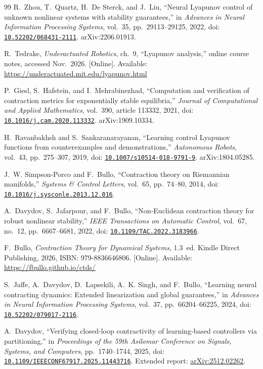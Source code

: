 \documentclass[12pt,onecolumn,journal]{IEEEtran}
\begin{document}
\begin{thebibliography}{99}
R.~Zhou, T.~Quartz, H.~De Sterck, and J.~Liu,
``Neural Lyapunov control of unknown nonlinear systems with stability guarantees,''
in \emph{Advances in Neural Information Processing Systems}, vol.~35, pp.~29113--29125, 2022, doi: \href{https://doi.org/10.52202/068431-2111}{\nolinkurl{10.52202/068431-2111}}. arXiv:2206.01913.

R.~Tedrake,
\emph{Underactuated Robotics}, ch.~9, ``Lyapunov analysis,'' online course notes, accessed Nov.~2026. [Online]. Available: \url{https://underactuated.mit.edu/lyapunov.html}

P.~Giesl, S.~Hafstein, and I.~Mehrabinezhad,
``Computation and verification of contraction metrics for exponentially stable equilibria,''
\emph{Journal of Computational and Applied Mathematics}, vol.~390, article 113332, 2021, doi: \href{https://doi.org/10.1016/j.cam.2020.113332}{\nolinkurl{10.1016/j.cam.2020.113332}}. arXiv:1909.10334.

H.~Ravanbakhsh and S.~Sankaranarayanan,
``Learning control Lyapunov functions from counterexamples and demonstrations,''
\emph{Autonomous Robots}, vol.~43, pp.~275--307, 2019, doi: \href{https://doi.org/10.1007/s10514-018-9791-9}{\nolinkurl{10.1007/s10514-018-9791-9}}. arXiv:1804.05285.

J.~W. Simpson-Porco and F.~Bullo,
``Contraction theory on Riemannian manifolds,''
\emph{Systems \& Control Letters}, vol.~65, pp.~74--80, 2014,
doi: \href{https://doi.org/10.1016/j.sysconle.2013.12.016}{\nolinkurl{10.1016/j.sysconle.2013.12.016}}.

A.~Davydov, S.~Jafarpour, and F.~Bullo,
``Non-Euclidean contraction theory for robust nonlinear stability,''
\emph{IEEE Transactions on Automatic Control}, vol.~67, no.~12, pp.~6667--6681, 2022,
doi: \href{https://doi.org/10.1109/TAC.2022.3183966}{\nolinkurl{10.1109/TAC.2022.3183966}}.

F.~Bullo,
\emph{Contraction Theory for Dynamical Systems}, 1.3~ed.
Kindle Direct Publishing, 2026, ISBN: 979-8836646806.
[Online]. Available: \url{https://fbullo.github.io/ctds/}

S.~Jaffe, A.~Davydov, D.~Lapsekili, A.~K. Singh, and F.~Bullo,
``Learning neural contracting dynamics: Extended linearization and global guarantees,''
in \emph{Advances in Neural Information Processing Systems}, vol.~37, pp.~66204--66225, 2024,
doi: \href{https://doi.org/10.52202/079017-2116}{\nolinkurl{10.52202/079017-2116}}.

A.~Davydov,
``Verifying closed-loop contractivity of learning-based controllers via partitioning,''
in \emph{Proceedings of the 59th Asilomar Conference on Signals, Systems, and Computers}, pp.~1740--1744, 2025,
doi: \href{https://doi.org/10.1109/IEEECONF67917.2025.11443716}{\nolinkurl{10.1109/IEEECONF67917.2025.11443716}}.
Extended report: \href{https://arxiv.org/abs/2512.02262}{arXiv:2512.02262}.

\end{thebibliography}
\end{document}
